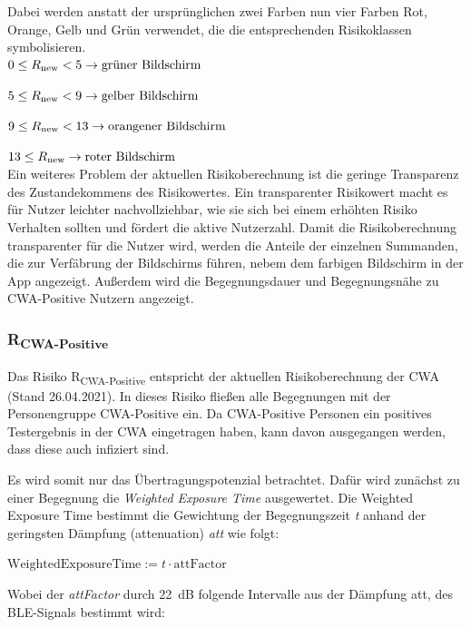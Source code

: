 \documentclass[conference,compsoc]{IEEEtran}
\begin{document}
Dabei werden anstatt der ursprünglichen zwei Farben nun vier Farben Rot, Orange, Gelb und Grün verwendet, die die entsprechenden Risikoklassen symbolisieren.
\\

$0\le R\textsubscript{new} < 5 \rightarrow \text{grüner Bildschirm}$

$5\le R\textsubscript{new} < 9 \rightarrow \text{gelber Bildschirm}$

$9\le R\textsubscript{new} < 13 \rightarrow \text{orangener Bildschirm}$

$13 \le R\textsubscript{new}  \rightarrow \text{roter Bildschirm}$
\\

Ein weiteres Problem der aktuellen Risikoberechnung ist die geringe Transparenz des Zustandekommens des Risikowertes.
Ein transparenter Risikowert macht es für Nutzer leichter nachvollziehbar, wie sie sich bei einem erhöhten Risiko Verhalten sollten und fördert die aktive Nutzerzahl.
Damit die Risikoberechnung transparenter für die Nutzer wird, werden die Anteile der einzelnen Summanden, die zur Verfäbrung der Bildschirms führen,
nebem dem farbigen Bildschirm in der App angezeigt.
Außerdem wird die Begegnungsdauer und Begegnungsnähe zu CWA-Positive Nutzern angezeigt.\\

\subsubsection{R\textsubscript{CWA-Positive}}\label{CWAPositive}

Das Risiko R\textsubscript{CWA-Positive} entspricht der aktuellen Risikoberechnung der CWA (Stand 26.04.2021). 
In dieses Risiko fließen alle Begegnungen mit der Personengruppe CWA-Positive ein. 
Da CWA-Positive Personen ein positives Testergebnis in der CWA eingetragen haben, kann davon ausgegangen werden, dass diese auch infiziert sind.

Es wird somit nur das Übertragungspotenzial betrachtet. 
Dafür wird zunächst zu einer Begegnung die \textit{Weighted Exposure Time} ausgewertet. 
Die Weighted Exposure Time bestimmt die Gewichtung der Begegnungszeit \textit{t} anhand der geringsten Dämpfung (attenuation) \textit{att}  wie folgt: 

\centerline{\text{ }}
\centerline{$\text{WeightedExposureTime} := t \cdot \text{attFactor}$}
\centerline{\text{ }}

Wobei der \textit{attFactor} durch \SI{22}{dB} folgende Intervalle aus der Dämpfung att, des BLE-Signals bestimmt wird:
\end{document}
